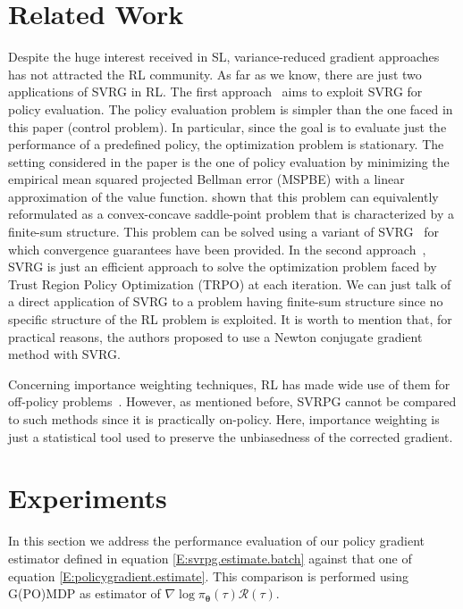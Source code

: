 \documentclass{article}
\makeatletter
\theoremstyle{remark}
\theoremstyle{definition}
\DeclareRobustCommand{\eg}{e.g.,\@\xspace}
\newcommand{\vtheta}{\boldsymbol{\theta}}
\newcommand{\Reward}{\mathcal{R}}
\newcommand{\score}[2]{\nabla\log\pi_{#1}(#2)}
\makeatother
\begin{document}
\section{Related Work}
Despite the huge interest received in SL, variance-reduced gradient approaches has not attracted the RL community.
As far as we know, there are just two applications of SVRG in RL.
The first approach~\citep{du2017svrgpe} aims to exploit SVRG for policy evaluation.
The policy evaluation problem is simpler than the one faced in this paper (control problem).
In particular, since the goal is to evaluate just the performance of a predefined policy, the optimization problem is stationary.
The setting considered in the paper is the one of policy evaluation by minimizing the empirical mean squared projected Bellman error (MSPBE) with a linear approximation of the value function. \citet{du2017svrgpe} shown that this problem can equivalently reformulated as a convex-concave saddle-point problem that is characterized by a finite-sum structure.
This problem can be solved using a variant of SVRG~\citep{Palaniappan2016svrgsaddle} for which convergence guarantees have been provided.
In the second approach~\citep{xu2017svrgtrpo}, SVRG is just an efficient approach to solve the optimization problem faced by Trust Region Policy Optimization (TRPO) at each iteration. We can just talk of a direct application of SVRG to a problem having finite-sum structure since no specific structure of the RL problem is exploited.
It is worth to mention that, for practical reasons, the authors proposed to use a Newton conjugate gradient method with SVRG.

Concerning importance weighting techniques, RL has made wide use of them for off-policy problems~\citep[\eg][]{precup2000eligibility,thomas2015high}. However, as mentioned before, SVRPG cannot be compared to such methods since it is practically on-policy. Here, importance weighting is just a statistical tool used to preserve the unbiasedness of the corrected gradient.


\section{Experiments}\label{sec:exp}
In this section we address the performance evaluation of our policy gradient estimator defined in equation \ref{E:svrpg.estimate.batch} against that one of equation \ref{E:policygradient.estimate}. This comparison is performed using G(PO)MDP as estimator of $\score{\vtheta}{\tau}\Reward(\tau)$.
 
\end{document}
